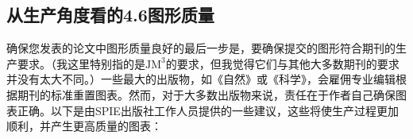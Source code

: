 \subsection*{从生产角度看的4.6图形质量}
确保您发表的论文中图形质量良好的最后一步是，要确保提交的图形符合期刊的生产要求。（我这里特别指的是$\mathrm{JM}^{3}$的要求，但我觉得它们与其他大多数期刊的要求并没有太大不同。）一些最大的出版物，如《自然》或《科学》，会雇佣专业编辑根据期刊的标准重置图表。然而，对于大多数出版物来说，责任在于作者自己确保图表正确。以下是由SPIE出版社工作人员提供的一些建议，这些将使生产过程更加顺利，并产生更高质量的图表：

